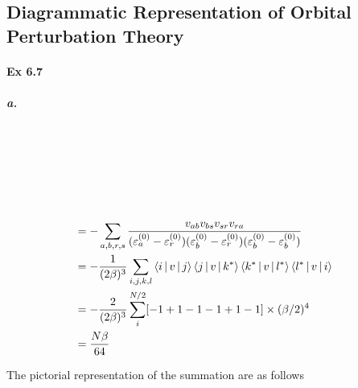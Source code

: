 \documentclass[a4paper]{article}
\newcommand{\ex}[1]{\paragraph{Ex #1}}
\newcommand{\subex}[1]{\subparagraph{#1}}
\numberwithin{equation}{subsection}
\begin{document}
\newpage
\subsection{Diagrammatic Representation of Orbital Perturbation Theory}
\ex{6.7}
\subex{a.}
~\\
\begin{minipage}{0.2\linewidth}
		\hfill
	\\
	\vspace{25pt}\\
\end{minipage}
\begin{minipage}{0.8\linewidth}
	\vspace{25pt}~\\
	\begin{align}
	&= - \sum_{a,b,r,s} \dfrac{v_{ab}v_{bs}v_{sr}v_{ra}}{(\varepsilon_a^{(0)} - \varepsilon_r^{(0)})(\varepsilon_b^{(0)} - \varepsilon_r^{(0)})(\varepsilon_b^{(0)} - \varepsilon_b^{(0)})}  &\notag\\
	&= -\dfrac{1}{(2\beta)^3} \sum_{i,j,k,l} \Braket{i|v|j}\Braket{j|v|k^*}\Braket{k^*|v|l^*}\Braket{l^*|v|i} & \notag\\
	&= -\dfrac{2}{(2\beta)^3} \sum_i^{N/2} [-1 + 1 -1 -1 +1 -1]\times (\beta/2)^4  & \notag\\
	&= \dfrac{N\beta}{64}  & \notag\\
	\end{align}
\end{minipage}
The pictorial representation of the summation are as follows\\
\end{document}
